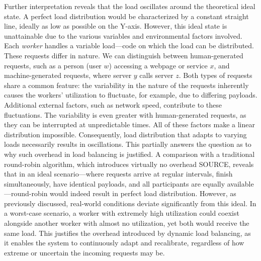 \documentclass[twocolumn]{webofc}
\begin{document}
Further interpretation reveals that the load oscillates around the theoretical ideal state. A perfect load distribution would be characterized by a constant straight line, ideally as low as possible on the Y-axis. However, this ideal state is unattainable due to the various variables and environmental factors involved. Each \textit{worker} handles a variable load—code on which the load can be distributed. These requests differ in nature. We can distinguish between human-generated requests, such as a person (user \(w\)) accessing a webpage or service \(x\), and machine-generated requests, where server \(y\) calls server \(z\). Both types of requests share a common feature: the variability in the nature of the requests inherently causes the workers' utilization to fluctuate, for example, due to differing payloads. Additional external factors, such as network speed, contribute to these fluctuations. The variability is even greater with human-generated requests, as they can be interrupted at unpredictable times. All of these factors make a linear distribution impossible. Consequently, load distribution that adapts to varying loads necessarily results in oscillations. This partially answers the question as to why such overhead in load balancing is justified. A comparison with a traditional round-robin algorithm, which introduces virtually no overhead {\color{red} SOURCE}, reveals that in an ideal scenario—where requests arrive at regular intervals, finish simultaneously, have identical payloads, and all participants are equally available—round-robin would indeed result in perfect load distribution. However, as previously discussed, real-world conditions deviate significantly from this ideal. In a worst-case scenario, a worker with extremely high utilization could coexist alongside another worker with almost no utilization, yet both would receive the same load. This justifies the overhead introduced by dynamic load balancing, as it enables the system to continuously adapt and recalibrate, regardless of how extreme or uncertain the incoming requests may be.
\end{document}
